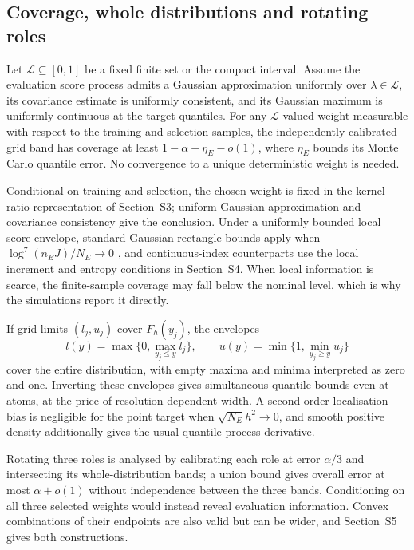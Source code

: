 \subsection{Coverage, whole distributions and rotating roles}
\begin{theorem}\label{th:coverage}
Let $\mathcal L\subseteq[0,1]$ be a fixed finite set or the compact interval. Assume the evaluation score process admits a Gaussian approximation uniformly over $\lambda\in\mathcal L$, its covariance estimate is uniformly consistent, and its Gaussian maximum is uniformly continuous at the target quantiles. For any $\mathcal L$-valued weight measurable with respect to the training and selection samples, the independently calibrated grid band has coverage at least $1-\alpha-\eta_E-o(1)$, where $\eta_E$ bounds its Monte Carlo quantile error. No convergence to a unique deterministic weight is needed.
\end{theorem}

\begin{remark}\label{rem:coverage}
Conditional on training and selection, the chosen weight is fixed in the kernel-ratio representation of Section~S3; uniform Gaussian approximation and covariance consistency give the conclusion. Under a uniformly bounded local score envelope, standard Gaussian rectangle bounds apply when $\log^7(n_EJ)/N_E\to0$ \citep{cck2016clt}, and continuous-index counterparts use the local increment and entropy conditions in Section~S4. When local information is scarce, the finite-sample coverage may fall below the nominal level, which is why the simulations report it directly.
\end{remark}

If grid limits $(l_j,u_j)$ cover $F_h(y_j)$, the envelopes
\begin{equation}\label{eq:envelope}
 l(y)=\max\{0,\max_{y_j\leq y}l_j\},\qquad
 u(y)=\min\{1,\min_{y_j\geq y}u_j\}
\end{equation}
cover the entire distribution, with empty maxima and minima interpreted as zero and one. Inverting these envelopes gives simultaneous quantile bounds even at atoms, at the price of resolution-dependent width. A second-order localisation bias is negligible for the point target when $\sqrt{N_E}h^2\to0$, and smooth positive density additionally gives the usual quantile-process derivative.

Rotating three roles is analysed by calibrating each role at error $\alpha/3$ and intersecting its whole-distribution bands; a union bound gives overall error at most $\alpha+o(1)$ without independence between the three bands. Conditioning on all three selected weights would instead reveal evaluation information. Convex combinations of their endpoints are also valid but can be wider, and Section~S5 gives both constructions.


